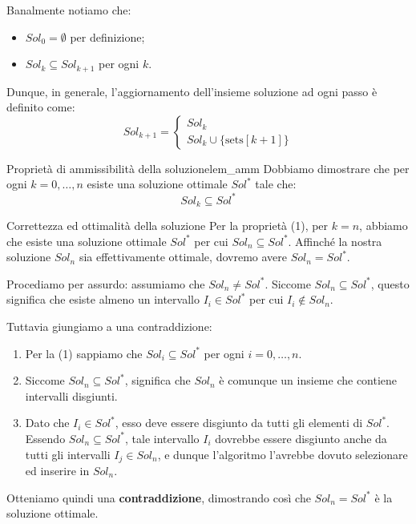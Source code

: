 \documentclass[12pt]{report}
\begin{document}
	Banalmente notiamo che:
	\begin{itemize}
		\item $Sol_0 = \emptyset$ per definizione;
		\item $Sol_k \subseteq Sol_{k+1}$ per ogni $k$.
	\end{itemize}
	
	Dunque, in generale, l'aggiornamento dell'insieme soluzione ad ogni passo è definito come:
	\[
	Sol_{k+1} = \begin{cases}
		Sol_k \\
		Sol_k \cup \{\text{sets}[k+1]\}
	\end{cases}
	\]
	
	\begin{lemma}{Proprietà di ammissibilità della soluzione}{lem_amm}
		Dobbiamo dimostrare che per ogni $k = 0, \dots, n$ esiste una soluzione ottimale $Sol^*$ tale che:
		\begin{equation}
			Sol_k \subseteq Sol^* \tag{1}
		\end{equation}
	\end{lemma}
	
	\begin{dimostrazione}{Correttezza ed ottimalità della soluzione}{}
		Per la proprietà (1), per $k = n$, abbiamo che esiste una soluzione ottimale $Sol^*$ per cui $Sol_n \subseteq Sol^*$.
		Affinché la nostra soluzione $Sol_n$ sia effettivamente ottimale, dovremo avere $Sol_n = Sol^*$.
		
		Procediamo per assurdo: assumiamo che $Sol_n \neq Sol^*$. Siccome $Sol_n \subseteq Sol^*$, questo significa che esiste almeno un intervallo $I_i \in Sol^*$ per cui $I_i \notin Sol_n$.
		
		Tuttavia giungiamo a una contraddizione:
		\begin{enumerate}
			\item Per la (1) sappiamo che $Sol_i \subseteq Sol^*$ per ogni $i = 0, \dots, n$.
			\item Siccome $Sol_n \subseteq Sol^*$, significa che $Sol_n$ è comunque un insieme che contiene intervalli disgiunti.
			\item Dato che $I_i \in Sol^*$, esso deve essere disgiunto da tutti gli elementi di $Sol^*$. Essendo $Sol_n \subseteq Sol^*$, tale intervallo $I_i$ dovrebbe essere disgiunto anche da tutti gli intervalli $I_j \in Sol_n$, e dunque l'algoritmo l'avrebbe dovuto selezionare ed inserire in $Sol_n$.
		\end{enumerate}
		Otteniamo quindi una \textbf{contraddizione}, dimostrando così che $Sol_n = Sol^*$ è la soluzione ottimale.
	\end{dimostrazione}
	
\end{document}
